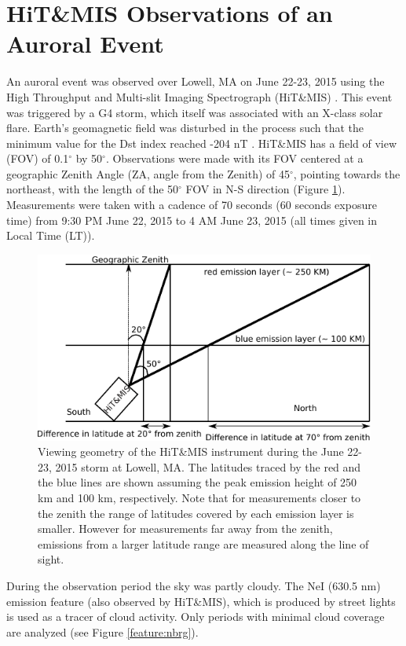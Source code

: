 \documentclass[crop=false,class=mitthesis,oneside,font=12pt]{standalone}
\begin{document}
\section{HiT\&MIS Observations of an Auroral Event}
An auroral event was observed over Lowell, MA on June 22-23, 2015 using the High Throughput and Multi-slit Imaging Spectrograph (HiT\&MIS) \citep{hitmis}. This event was triggered by a G4 storm, which itself was associated with an X-class solar flare. Earth's geomagnetic field was disturbed in the process such that the minimum value for the Dst index reached -204 nT \citep{baker_dst}. HiT\&MIS has a field of view (FOV) of 0.1$^\circ$ by 50$^\circ$. Observations were made with its FOV centered at a geographic Zenith Angle (ZA, angle from the Zenith) of 45$^\circ$, pointing towards the northeast, with the length of the 50$^\circ$ FOV in N-S direction (Figure \ref{fig:elayer1}). Measurements were taken with a cadence of 70 seconds (60 seconds exposure time) from 9:30 PM June 22, 2015 to 4 AM June 23, 2015 (all times given in Local Time (LT)). 
\begin{figure}[H]
	\centering\includegraphics[width=35pc]{elayer.pdf}
	\caption{Viewing geometry of the HiT\&MIS instrument during the June 22-23, 2015 storm at Lowell, MA. The latitudes traced by the red and the blue lines are shown assuming the peak emission height of
		250 km and 100 km, respectively. Note that for measurements closer to the zenith the range of latitudes covered by each emission layer is smaller. However for measurements far away from the zenith, emissions from a larger latitude range are measured along the line of sight.}
	\label{fig:elayer1}
\end{figure}

During the observation period the sky was partly cloudy. The NeI (630.5 nm) emission feature (also observed by HiT\&MIS), which is produced by street lights is used as a tracer of cloud activity. Only periods with minimal cloud coverage are analyzed (see Figure \ref{feature:nbrg}). 
\end{document}
